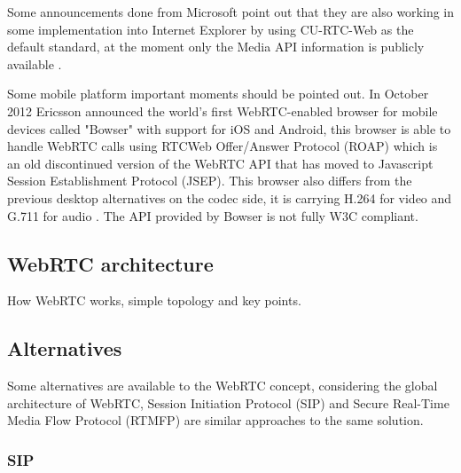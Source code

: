 Some announcements done from Microsoft point out that they are also working in some implementation into Internet Explorer by using CU-RTC-Web as the default standard, at the moment only the Media API information is publicly available \cite{microsoftcapture}.

Some mobile platform important moments should be pointed out. In October 2012 Ericsson announced the world's first WebRTC-enabled browser for mobile devices called "Bowser" with support for iOS and Android, this browser is able to handle WebRTC calls using RTCWeb Offer/Answer Protocol (ROAP) which is an old discontinued version of the WebRTC API that has moved to Javascript Session Establishment Protocol (JSEP). This browser also differs from the previous desktop alternatives on the codec side, it is carrying H.264 for video and G.711 for audio \cite{ericssonbowser}. The API provided by Bowser is not fully W3C compliant.

\subsection{WebRTC architecture}

How WebRTC works, simple topology and key points.

\subsection{Alternatives}

Some alternatives are available to the WebRTC concept, considering the global architecture of WebRTC, Session Initiation Protocol (SIP) and Secure Real-Time Media Flow Protocol (RTMFP) are similar approaches to the same solution.

\subsubsection{SIP}

